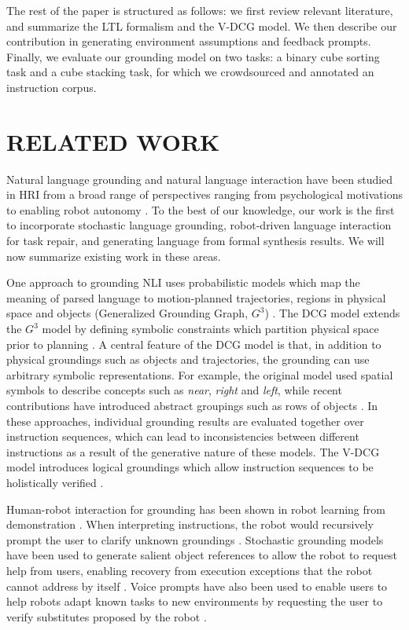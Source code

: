 \documentclass[letterpaper]{article} %
\begin{document}
The rest of the paper is structured as follows: we first review relevant literature, and summarize the LTL formalism and the V-DCG model.
We then describe our contribution in generating environment assumptions and feedback prompts.
Finally, we evaluate our grounding model on two tasks: a binary cube sorting task and a cube stacking task, for which we crowdsourced and annotated an instruction corpus.

\section{RELATED WORK}\label{sec:related_work}

Natural language grounding and natural language interaction have been studied in HRI from a broad range of perspectives ranging from psychological motivations to enabling robot autonomy \cite{roy2005grounding}. To the best of our knowledge, our work is the first to incorporate stochastic language grounding, robot-driven language interaction for task repair, and generating language from formal synthesis results. We will now summarize existing work in these areas.

One approach to grounding NLI uses probabilistic models which map the meaning of parsed language to motion-planned trajectories, regions in physical space and objects (Generalized Grounding Graph, $G^3$) \cite{tellex2011understanding}. The DCG model extends the $G^3$ model by defining symbolic constraints which partition physical space prior to planning \cite{howard2014natural}. A central feature of the DCG model is that, in addition to physical groundings such as objects and trajectories, the grounding can use arbitrary symbolic representations. For example, the original model used spatial symbols to describe concepts such as \textit{near}, \textit{right} and \textit{left}, while recent contributions have introduced abstract groupings such as rows of objects \cite{Paul2016Abstract}. In these approaches, individual grounding results are evaluated together over instruction sequences, which can lead to inconsistencies between different instructions as a result of the generative nature of these models. The V-DCG model introduces logical groundings which allow instruction sequences to be holistically verified \cite{boteanu2016model}.


Human-robot interaction for grounding has been shown in robot learning from demonstration \cite{argall2009survey}. When interpreting instructions, the robot would recursively prompt the user to clarify unknown groundings \cite{lauriar2001training,chao2011towards}.
Stochastic grounding models have been used to generate salient object references to allow the robot to request help from users, enabling recovery from execution exceptions that the robot cannot address by itself \cite{tellex2014asking}.
Voice prompts have also been used to enable users to help robots adapt known tasks to new environments by requesting the user to verify substitutes proposed by the robot \cite{boteanu2015towards}.
\end{document}
